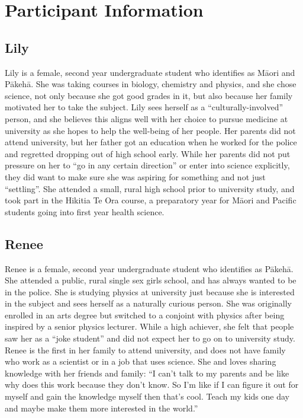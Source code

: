 \chapter*{Participant Information}

\section*{Lily}
Lily is a female, second year undergraduate student who identifies as M\={a}ori and P\={a}keh\={a}. She was taking courses in biology, chemistry and physics, and she chose science, not only because she got good grades in it, but also because her family motivated her to take the subject. Lily sees herself as a ``culturally-involved'' person, and she believes this aligns well with her choice to pursue medicine at university as she hopes to help the well-being of her people. Her parents did not attend university, but her father got an education when he worked for the police and regretted dropping out of high school early. While her parents did not put pressure on her to ``go in any certain direction'' or enter into science explicitly, they did want to make sure she was aspiring for something and not just ``settling''. She attended a small, rural high school prior to university study, and took part in the Hikitia Te Ora course, a preparatory year for M\={a}ori and Pacific students going into first year health science. 

\section*{Renee}
Renee is a female, second year undergraduate student who identifies as P\={a}keh\={a}. She attended a public, rural single sex girls school, and has always wanted to be in the police. She is studying physics at university just because she is interested in the subject and sees herself as a naturally curious person. She was originally enrolled in an arts degree but switched to a conjoint with physics after being inspired by a senior physics lecturer. While a high achiever, she felt that people saw her as a ``joke student'' and did not expect her to go on to university study. Renee is the first in her family to attend university, and does not have family who work as a scientist or in a job that uses science. She  and loves sharing knowledge with her friends and family: ``I can't talk to my parents and be like why does this work because they don't know. So I'm like if I can figure it out for myself and gain the knowledge myself then that's cool. Teach my kids one day and maybe make them more interested in the world.''

